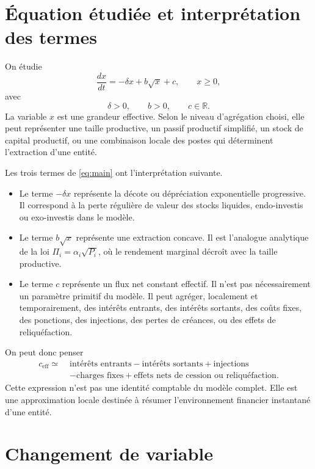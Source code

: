 \documentclass[11pt,a4paper]{article}
\begin{document}
\section{Équation étudiée et interprétation des termes}

On étudie
\begin{equation}
    \frac{dx}{dt}=-\delta x+b\sqrt{x}+c,\qquad x\geq 0,
    \label{eq:main}
\end{equation}
avec
\[
    \delta>0,\qquad b>0,\qquad c\in\mathbb{R}.
\]
La variable \(x\) est une grandeur effective. Selon le niveau d'agrégation choisi, elle peut représenter une taille productive, un passif productif simplifié, un stock de capital productif, ou une combinaison locale des postes qui déterminent l'extraction d'une entité.

Les trois termes de \eqref{eq:main} ont l'interprétation suivante.
\begin{itemize}
    \item Le terme \(-\delta x\) représente la décote ou dépréciation exponentielle progressive. Il correspond à la perte régulière de valeur des stocks liquides, endo-investis ou exo-investis dans le modèle.
    \item Le terme \(b\sqrt{x}\) représente une extraction concave. Il est l'analogue analytique de la loi \(\Pi_i=\alpha_i\sqrt{P_i}\), où le rendement marginal décroît avec la taille productive.
    \item Le terme \(c\) représente un flux net constant effectif. Il n'est pas nécessairement un paramètre primitif du modèle. Il peut agréger, localement et temporairement, des intérêts entrants, des intérêts sortants, des coûts fixes, des ponctions, des injections, des pertes de créances, ou des effets de reliquéfaction.
\end{itemize}

On peut donc penser
\[
\begin{aligned}
    c_{\mathrm{eff}}
    \simeq
\;&\text{intérêts entrants}
    -\text{intérêts sortants}
    +\text{injections} \\
    &-\text{charges fixes}
    +\text{effets nets de cession ou reliquéfaction}.
\end{aligned}
\]
Cette expression n'est pas une identité comptable du modèle complet. Elle est une approximation locale destinée à résumer l'environnement financier instantané d'une entité.

\section{Changement de variable}
\end{document}
